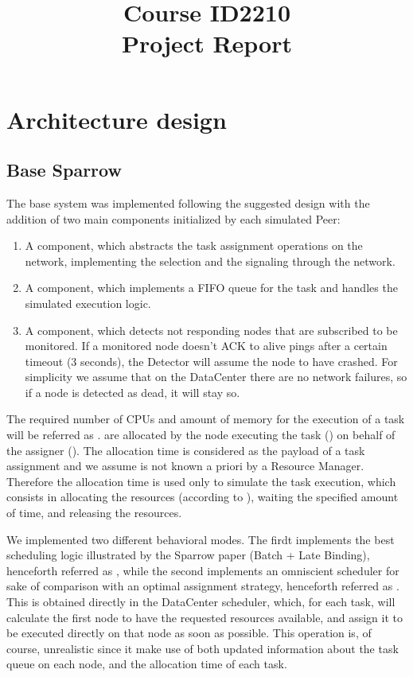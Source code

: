\documentclass[conference]{IEEEtran}
\title{
  Course ID2210\\
  Project Report
}
\author{
  \IEEEauthorblockN{Riccardo Reale}
  \IEEEauthorblockA{Peerialism AB\\
    {riccardo.reale@peerialism.com}\\
    \url{https://github.com/riccardoreale/id2210-vt14.git}
  }
  \and
  \IEEEauthorblockN{Giovanni Simoni}
  \IEEEauthorblockA{Peerialism AB\\
    {giovanni.simoni@peerialism.com}\\
    \url{https://github.com/dacav/id2210-vt14.git}
  }
}
\begin{document}
\maketitle

\section{Architecture design}

  \subsection{Base Sparrow}

  The base system was implemented following the suggested design with the
  addition of two main components initialized by each simulated Peer:
  \begin{enumerate}

  \item A \ResourceManager component, which abstracts the task assignment
    operations on the network, implementing the selection and the
    signaling through the network.

  \item A \RmWorker component, which implements a FIFO queue for the task and
    handles the simulated execution logic.

  \item A  component, which detects not
    responding nodes that are subscribed to be monitored. If a monitored
    node doesn't ACK to alive pings after a certain timeout (3 seconds),
    the Detector will assume the node to have crashed. For simplicity we
    assume that on the DataCenter there are no network failures, so if a
    node is detected as dead, it will stay so.

  \end{enumerate}

  The required number of CPUs and amount of memory for the execution of a
  task will be referred as \treq. \Treq are allocated by the node
  executing the task (\exc) on behalf of the assigner (\tmast). The
  allocation time is considered as the payload of a task assignment and
  we assume is not known a priori by a Resource Manager. Therefore the
  allocation time is used only to simulate the task execution, which
  consists in allocating the resources (according to \treq), waiting the
  specified amount of time, and releasing the resources.

  We implemented two different behavioral modes. The firdt implements the
  best scheduling logic illustrated by the Sparrow paper (Batch + Late
  Binding), henceforth referred as \us, while the second implements an
  omniscient scheduler for sake of comparison with an optimal assignment
  strategy, henceforth referred as \omni. This is obtained directly in the
  DataCenter scheduler, which, for each task, will calculate the first
  node to have the requested resources available, and assign it to be
  executed directly on that node as soon as possible. This operation is,
  of course, unrealistic since it make use of both updated information
  about the task queue on each node, and the allocation time of each task.
\end{document}
